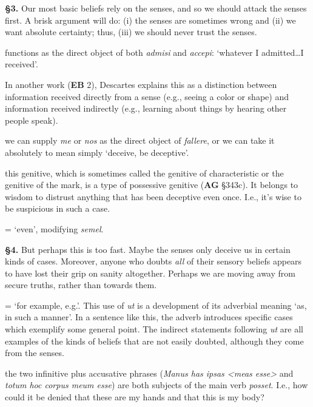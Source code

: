 \prenotes

\textbf{§3.} Our most basic beliefs rely on the senses, and so we should attack the senses first. A brisk argument will do: (i) the senses are sometimes wrong and (ii) we want absolute certainty; thus, (iii) we should never trust the senses.

 functions as the direct object of both \textit{admisi} and \textit{accepi}: `whatever I admitted\dots I received'.

 In another work (\textbf{EB} 2), Descartes explains this as a distinction between information received directly from a sense (e.g., seeing a color or shape) and information received indirectly (e.g., learning about things by hearing other people speak).

 we can supply \textit{me} or \textit{nos} as the direct object of \textit{fallere}, or we can take it absolutely to mean simply `deceive, be deceptive'.

 this genitive, which is sometimes called the genitive of characteristic or the genitive of the mark, is a type of possessive genitive (\textbf{AG} §343c). It belongs to wisdom to distrust anything that has been deceptive even once. I.e., it's wise to be suspicious in such a case.

 = `even', modifying \textit{semel}.

\textbf{§4.} But perhaps this is too fast. Maybe the senses only deceive us in certain kinds of cases. Moreover, anyone who doubts \textit{all} of their sensory beliefs appears to have lost their grip on sanity altogether. Perhaps we are moving away from secure truths, rather than towards them. 

 = `for example, e.g.'. This use of \textit{ut} is a development of its adverbial meaning `as, in such a manner'. In a sentence like this, the adverb introduces specific cases which exemplify some general point. The indirect statements following \textit{ut} are all examples of the kinds of beliefs that are not easily doubted, although they come from the senses.

 the two infinitive plus accusative phrases (\textit{Manus has ipsas <meas esse>} and \textit{totum hoc corpus meum esse}) are both subjects of the main verb \textit{posset}. I.e., how could it be denied that these are my hands and that this is my body?

